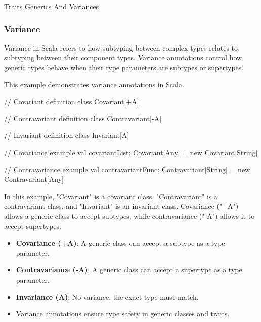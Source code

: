 \begin{notes}{Traits Generics And Variances}
\begin{highlight}[Generics]
    \end{highlight}
    
    \subsubsection*{Variance}
    
    Variance in Scala refers to how subtyping between complex types relates to subtyping between their component types. Variance annotations control how generic types behave when their type parameters are subtypes or supertypes.
    
    \begin{highlight}[Variance]
    
        This example demonstrates variance annotations in Scala.
    
    \begin{code}[Scala]
    // Covariant definition
    class Covariant[+A]
    
    // Contravariant definition
    class Contravariant[-A]
    
    // Invariant definition
    class Invariant[A]
    
    // Covariance example
    val covariantList: Covariant[Any] = new Covariant[String]
    
    // Contravariance example
    val contravariantFunc: Contravariant[String] = new Contravariant[Any]
    \end{code}
    
        In this example, "Covariant" is a covariant class, "Contravariant" is a contravariant class, and "Invariant" is an invariant class. Covariance ("+A") allows a generic class to accept subtypes, 
        while contravariance ("-A") allows it to accept supertypes.
    
        \begin{itemize}
            \item \textbf{Covariance (+A)}: A generic class can accept a subtype as a type parameter.
            \item \textbf{Contravariance (-A)}: A generic class can accept a supertype as a type parameter.
            \item \textbf{Invariance (A)}: No variance, the exact type must match.
            \item Variance annotations ensure type safety in generic classes and traits.
        \end{itemize}
    
    \end{highlight}
    

\end{notes}
